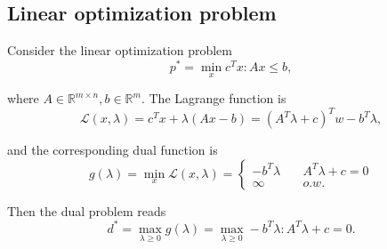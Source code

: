 \documentclass[../main.tex]{subfiles}
\begin{document}
\subsection{Linear optimization problem}
Consider the linear optimization problem $$p^*=\min_xc^Tx: Ax\leq b,$$

where $A\in \mathbb{R}^{m\times n}, b\in \mathbb{R}^m$. The Lagrange function is $$\mathcal{L}(x, \lambda)=c^Tx+\lambda(Ax-b)=(A^T\lambda+c)^Tw-b^T\lambda,$$

and the corresponding dual function is
\begin{equation} \label{eq2-3}
g(\lambda) = \min_x \mathcal{L}(x, \lambda) = \left\{
        \begin{array}{ll}
            -b^T\lambda & \quad A^T\lambda+c=0 \\
            \infty & \quad o.w.
        \end{array}
    \right.
\end{equation}

Then the dual problem reads $$d^*=\max_{\lambda\geq 0}g(\lambda)=\max_{\lambda\geq 0}-b^T\lambda: A^T\lambda+c=0.$$
\end{document}
